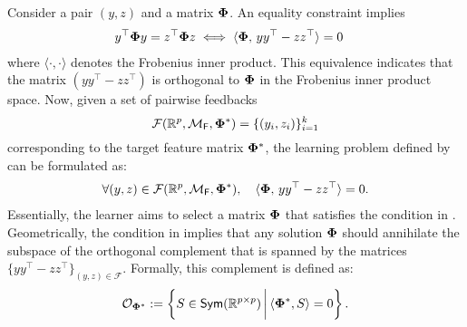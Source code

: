 \allowdisplaybreaks
Consider a pair $(y, z)$ and a matrix $\boldsymbol{\Phi}$. An equality constraint implies
\begin{align*}
    y^{\top} \pphi y = z^{\top} \pphi z &\iff \langle \pphi,\, yy^{\top} - zz^{\top} \rangle = 0 %
\end{align*}
where $\langle \cdot, \cdot \rangle$ denotes the Frobenius inner product. This equivalence indicates that the matrix $(yy^{\top} - zz^{\top})$ is orthogonal to $\boldsymbol{\Phi}$ in the Frobenius inner product space. Now, given a set of pairwise feedbacks 
\[
\mathcal{F}(\mathbb{R}^{p}, \mathcal{M}_{\mathsf{F}}, \boldsymbol{\Phi}^*) = \{ (y_i, z_i) \}_{i=1}^k
\]
corresponding to the target feature matrix $\boldsymbol{\Phi}^*$, the learning problem defined by  can be formulated as:
\begin{align}\label{eq: orthosat}
    \forall (y, z) \in \mathcal{F}(\mathbb{R}^p, \mathcal{M}_{\mathsf{F}}, \pphi^*), \quad \langle \pphi,\, yy^{\top} - zz^{\top} \rangle = 0. %
\end{align}
Essentially, the learner aims to select a matrix $\boldsymbol{\Phi}$ that satisfies the condition in .
Geometrically, the condition in  implies that any solution $\boldsymbol{\Phi}$ should annihilate the subspace of the orthogonal complement that is spanned by the matrices $\{ yy^{\top} - zz^{\top} \}_{(y,z) \in \mathcal{F}}$. Formally, this complement is defined as:\vspace{-1mm}
\[
\mathcal{O}_{\pphi^*} := \left\{ S \in \symm \,\bigg|\, \langle\pphi^*, S\rangle = 0 \right\}.\vspace{-3mm}
\]

